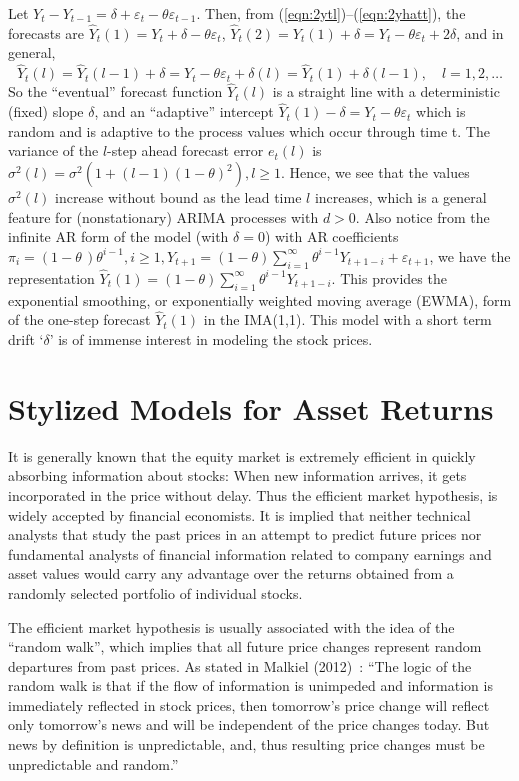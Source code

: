 \begin{ex}
 Let $Y_t - Y_{t-1} = \delta + \varepsilon_t - \theta\varepsilon_{t-1}$. Then, from (\ref{eqn:2ytl})--(\ref{eqn:2yhatt}), the forecasts are $\hat{Y}_t(1) = Y_t + \delta -\theta\varepsilon_t$, $\hat{Y}_t(2) = Y_t(1) + \delta = Y_t -\theta\varepsilon_t + 2\delta$, and in general,
	\[
	\hat{Y}_t(l) = \hat{Y}_t(l-1) + \delta = Y_t - \theta\varepsilon_t + \delta(l) = \hat{Y}_t(1) + \delta(l-1),\quad l= 1,2,\ldots
	\]
So the ``eventual'' forecast function $\hat{Y}_t(l)$ is a straight line with a deterministic (fixed) slope $\delta$, and an ``adaptive'' intercept $\hat{Y}_t(1) - \delta = Y_t - \theta\varepsilon_t$ which is random and is adaptive to the process values which occur through time t. The variance of the $l$-step ahead forecast error $e_t(l)$ is $\sigma^2(l) = \sigma^2(1 + (l-1)(1-\theta)^2), l\geq1$. Hence, we see that the values $\sigma^2(l)$ increase without bound as the lead time $l$ increases, which is a general feature for (nonstationary) ARIMA processes with $d > 0$. Also notice from the infinite AR form of the model (with $\delta = 0$) with AR coefficients $\pi_i = (1-\theta\,)\theta^{i-1}, i\geq1, Y_{t+1} = (1-\theta)\sum_{i=1}^\infty\theta^{i-1}Y_{t+1-i} + \varepsilon_{t+1}$, we have the representation $\hat{Y}_t(1) = (1-\theta)\sum_{i=1}^\infty\theta^{i-1}Y_{t+1-i}$. This provides the exponential smoothing, or exponentially weighted moving average (EWMA), form of the one-step forecast $\hat{Y}_t(1)$ in the IMA(1,1). This model with a short term drift `$\delta$' is of immense interest in modeling the stock prices.
\end{ex}


\section{Stylized Models for Asset Returns}


It is generally known that the equity market is extremely efficient in quickly absorbing information about stocks: When new information arrives, it gets incorporated in the price without delay. Thus the efficient market hypothesis, is widely accepted by financial economists. It is implied that neither technical analysts that study the past prices in an attempt to predict future prices nor fundamental analysts of financial information related to company earnings and asset values would carry any advantage over the returns obtained from a randomly selected portfolio of individual stocks.


The efficient market hypothesis is usually associated with the idea of the ``random walk'', which implies that all future price changes represent random departures from past prices. As stated in Malkiel (2012)~\cite{malkiel}: ``The logic of the random walk is that if the flow of information is unimpeded and information is immediately reflected in stock prices, then tomorrow's price change will reflect only tomorrow's news and will be independent of the price changes today. But news by definition is unpredictable, and, thus resulting price changes must be unpredictable and random.''


